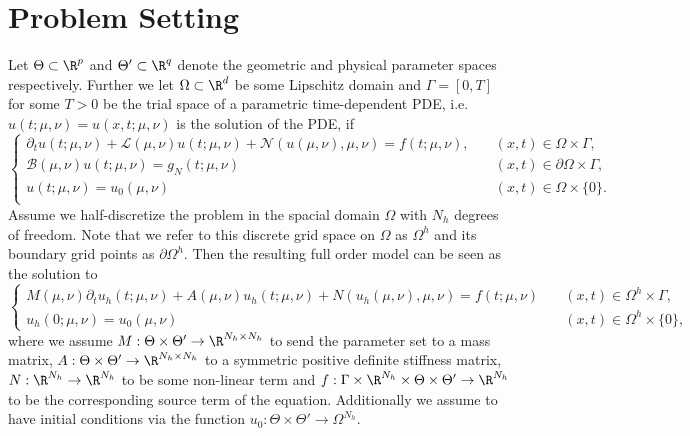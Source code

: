 %
%


\section{Problem Setting}

Let $\Theta \subset \R^{p}$ and $\Theta' \subset \R^q$ denote the geometric and physical parameter spaces respectively. Further we let $\Omega \subset \R^d$ be some Lipschitz domain and $\Gamma = [0, T]$ for some $T > 0$ be the trial space of a parametric time-dependent PDE, i.e. $u(t; \mu, \nu) = u(x, t; \mu, \nu)$ is the solution of the PDE, if
\begin{equation*}\begin{cases}
    \partial_t u(t; \mu, \nu) + \mathcal{L}(\mu, \nu)u(t; \mu, \nu) + \mathcal{N}(u(\mu, \nu), \mu, \nu) = f(t; \mu, \nu), \quad &(x, t) \in \Omega \times \Gamma, \\
    \mathcal{B}(\mu, \nu) u(t; \mu, \nu) = g_N(t; \mu, \nu) &(x, t) \in \partial \Omega \times \Gamma, \\
    u(t; \mu, \nu) = u_0(\mu, \nu) &(x, t) \in \Omega \times \{0 \}. \\
\end{cases}
\end{equation*}
Assume we half-discretize the problem in the spacial domain $\Omega$ with $N_h$ degrees of freedom. Note that we refer to this discrete grid space on $\Omega$ as $\Omega^h$ and its boundary grid points as $\partial \Omega^{h}$. Then the resulting full order model can be seen as the solution to 
\begin{equation*} \begin{cases}
    M(\mu, \nu) \partial_{t} u_h(t; \mu, \nu) + A(\mu, \nu) u_h(t; \mu, \nu) + N(u_h(\mu, \nu), \mu, \nu)= f(t; \mu, \nu)  \quad &(x, t) \in \Omega^{h} \times \Gamma, \\
    u_h(0; \mu, \nu) = u_0(\mu, \nu) \quad &(x, t) \in \Omega^{h} \times \{0\}, \end{cases} 
\end{equation*}
where we assume $M: \Theta \times \Theta' \to \R^{N_h \times N_h}$ to send the parameter set to a mass matrix, $A: \Theta \times \Theta' \to \R^{N_h \times N_h}$ to a symmetric positive definite stiffness matrix, $N: \R^{N_h} \to \R^{N_h}$ to be some non-linear term and $f: \Gamma \times \R^{N_h} \times \Theta \times \Theta' \to \R^{N_h}$ to be the corresponding source term of the equation. Additionally we assume to have initial conditions via the function $u_0: \Theta \times \Theta' \to \Omega^{N_h}$.

